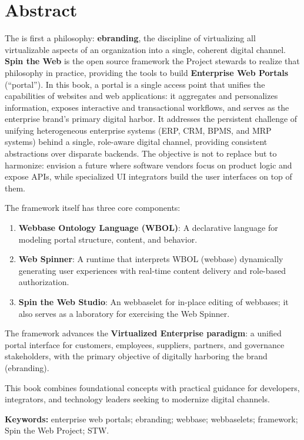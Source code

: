 
\chapter*{Abstract}
The \organization{} is first a philosophy: \textbf{\gls{ebranding}}, the discipline of virtualizing all virtualizable aspects of an organization into a single, coherent digital channel. \textbf{Spin the Web} is the open source framework the Project stewards to realize that philosophy in practice, providing the tools to build \textbf{Enterprise Web Portals} (``\gls{portal}''). In this book, a portal is a single access point that unifies the capabilities of websites and web applications: it aggregates and personalizes information, exposes interactive and transactional workflows, and serves as the enterprise brand's primary digital harbor. It addresses the persistent challenge of unifying heterogeneous enterprise systems (ERP, CRM, BPMS, and MRP systems) behind a single, role-aware digital channel, providing consistent abstractions over disparate backends. The objective is not to replace but to harmonize: envision a future where software vendors focus on product logic and expose APIs, while specialized UI integrators build the user interfaces on top of them.

The framework itself has three core components:
\begin{enumerate}
\item \textbf{Webbase Ontology Language (WBOL)}: A declarative language for modeling portal structure, content, and behavior.
\item \textbf{Web Spinner}: A runtime that interprets WBOL (webbase) dynamically generating user experiences with real-time content delivery and role-based authorization.
\item \textbf{Spin the Web Studio}: An webbaselet for in-place editing of webbases; it also serves as a laboratory for exercising the Web Spinner.
\end{enumerate}

The framework advances the \textbf{Virtualized Enterprise paradigm}: a unified portal interface for customers, employees, suppliers, partners, and governance stakeholders, with the primary objective of digitally harboring the brand (\gls{ebranding}).

This book combines foundational concepts with practical guidance for developers, integrators, and technology leaders seeking to modernize digital channels.

\textbf{Keywords:} enterprise web portals; ebranding; webbase; webbaselets; framework; Spin the Web Project; STW.

\clearpage
